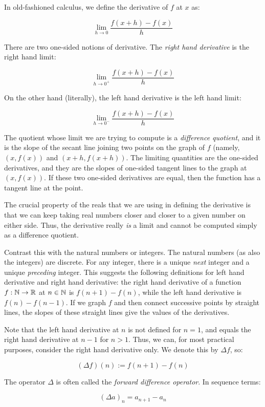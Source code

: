 \documentclass{amsart}
\begin{document}
In old-fashioned calculus, we define the derivative of $f$ at $x$ as:

$$\lim_{h \to 0} \frac{f(x + h) - f(x)}{h}$$

There are two one-sided notions of derivative. The {\em right hand
derivative} is the right hand limit:

$$\lim_{h \to 0^+} \frac{f(x + h) - f(x)}{h}$$

On the other hand (literally), the left hand derivative is the left hand limit:

$$\lim_{h \to 0^-} \frac{f(x + h) - f(x)}{h}$$

The quotient whose limit we are trying to compute is a {\em difference
quotient}, and it is the slope of the secant line joining two points
on the graph of $f$ (namely, $(x,f(x))$ and $(x + h, f(x+ h))$. The
limiting quantities are the one-sided derivatives, and they are the
slopes of one-sided tangent lines to the graph at $(x,f(x))$. If these
two one-sided derivatives are equal, then the function has a tangent
line at the point.

The crucial property of the reals that we are using in defining the
derivative is that we can keep taking real numbers closer and closer
to a given number on either side. Thus, the derivative really {\em is}
a limit and cannot be computed simply as a difference quotient.

Contrast this with the natural numbers or integers. The natural
numbers (as also the integers) are discrete. For any integer, there
is a unique {\em next} integer and a unique {\em preceding}
integer. This suggests the following definitions for left hand
derivative and right hand derivative: the right hand derivative of a
function $f:\mathbb{N} \to \mathbb{R}$ at $n \in \mathbb{N}$ is $f(n + 1) - f(n)$, while the
left hand derivative is $f(n) - f(n - 1)$. If we graph $f$ and then
connect successive points by straight lines, the slopes of these
straight lines give the values of the derivatives.

Note that the left hand derivative at $n$ is not defined for $n = 1$,
and equals the right hand derivative at $n - 1$ for $n > 1$. Thus, we
can, for most practical purposes, consider the right hand derivative
only. We denote this by $\Delta f$, so:

$$(\Delta f)(n) := f(n + 1) - f(n)$$

The operator $\Delta$ is often called the {\em forward difference
operator}. In sequence terms:

$$(\Delta a)_n = a_{n+1} - a_n$$
\end{document}
